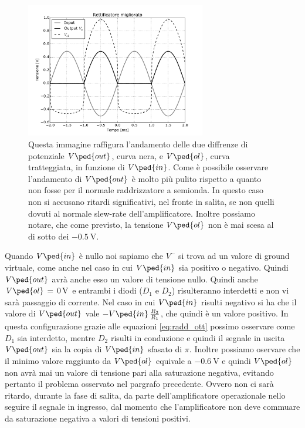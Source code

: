 \begin{figure}
        \centering
        \includegraphics[width=0.7\textwidth]{figure/radd_ott_graph.pdf}
        \caption{Questa immagine raffigura l'andamento delle due diffrenze di potenziale $V\ped{out}$, curva nera, e $V\ped{ol}$, curva tratteggiata, in funzione di $V\ped{in}$. Come è possibile osservare l'andamento di $V\ped{out}$ è molto più pulito rispetto a quanto non fosse per il normale raddrizzatore a semionda. In questo caso non si accusano ritardi significativi, nel fronte in salita, se non quelli dovuti al normale slew-rate dell'amplificatore. Inoltre possiamo notare, che come previsto, la tensione $V\ped{ol}$ non è mai scesa al di sotto dei $\SI{-0.5}{\volt}$.}
        \label{fig:radd_ott_plot}
\end{figure}

Quando $V\ped{in}$ è nullo noi sapiamo che $V^-$ si trova ad un valore di ground virtuale, come anche nel caso in cui $V\ped{in}$ sia positivo o negativo. Quindi $V\ped{out}$ avrà anche esso un valore di tensione nullo. Quindi anche $V\ped{ol}\,=\,\SI{0}{\volt}$ e entrambi i diodi ($D_1$ e $D_2$) risulteranno interdetti e non vi sarà passaggio di corrente.
Nel caso in cui $V\ped{in}$ risulti negativo si ha che il valore di $V\ped{out}$ vale $-V\ped{in}\,\frac{R_2}{R_1}$, che quindi è un valore positivo. In questa configurazione grazie alle equazioni \ref{eq:radd_ott} possimo osservare come $D_1$ sia interdetto, mentre $D_2$ risulti in conduzione e quindi il segnale in uscita $V\ped{out}$ sia la copia di $V\ped{in}$ sfasato di $\pi$. Inoltre possiamo oservare che il minimo valore raggiunto da $V\ped{ol}$ equivale a $\SI{-0.6}{\volt}$ e quindi $V\ped{ol}$ non avrà mai un valore di tensione pari alla saturazione negativa, evitando pertanto il problema osservato nel pargrafo precedente. Ovvero non ci sarà ritardo, durante la fase di salita, da parte dell'amplificatore operazionale nello seguire il segnale in ingresso, dal momento che l'amplificatore non deve commuare da saturazione negativa a valori di tensioni positivi.

